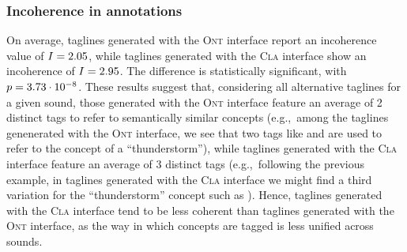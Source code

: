 \subsubsection{Incoherence in annotations}


On average, taglines generated with the \textsc{Ont} interface report an incoherence value of $I=2.05$, while taglines generated with the \textsc{Cla} interface show an incoherence of $I=2.95$. The difference is statistically significant, with $p = 3.73\cdot 10^{-8}$. 
These results suggest that, considering all alternative taglines for a given sound, those generated with the \textsc{Ont} interface feature an average of 2 distinct tags to refer to semantically similar concepts (e.g.,~among the taglines genenerated with the \textsc{Ont} interface, we see that two tags like  and  are used to refer to the concept of a ``thunderstorm''), while taglines generated with the \textsc{Cla} interface feature an average of 3 distinct tags (e.g.,~following the previous example, in taglines generated with the \textsc{Cla} interface we might find a third variation for the ``thunderstorm'' concept such as ). 
Hence, taglines generated with the \textsc{Cla} interface tend to be less coherent than taglines generated with the \textsc{Ont} interface, as the way in which concepts are tagged is less unified across sounds.

